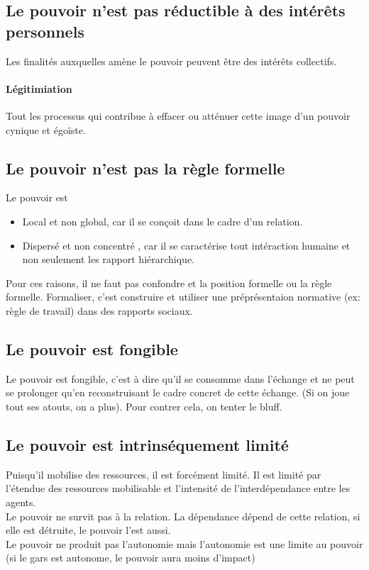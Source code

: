\documentclass[11pt]{article} %
\begin{document}
	\subsection{Le pouvoir n'est pas réductible à des intérêts personnels}
		Les finalités auxquelles amène le pouvoir peuvent être des intérêts collectifs.
		\paragraph{Légitimiation} Tout les processus qui contribue à effacer ou atténuer cette image d'un
		pouvoir cynique et égoïste.
	\subsection{Le pouvoir n'est pas la règle formelle}
		Le pouvoir est
		\begin{itemize}
			\item Local et non global, car il se conçoit dans le cadre d'un relation.
			\item Dispersé et non concentré , car il se caractérise tout intéraction humaine et non 
			seulement les rapport hiérarchique.
		\end{itemize}
		Pour ces raisons, il ne faut pas confondre et la position formelle ou la règle formelle. Formaliser, c'est
		construire et utiliser une préprésentaion normative (ex: règle de travail) dans des rapports sociaux.
	\subsection{Le pouvoir est fongible}
		Le pouvoir est fongible, c'est à dire qu'il se consomme dans l'échange et ne peut se prolonger qu'en
		reconstruisant le cadre concret de cette échange. (Si on joue tout ses atouts, on a plus).
		Pour contrer cela, on tenter le bluff.
	\subsection{Le pouvoir est intrinséquement limité}
		Puisqu'il mobilise des ressources, il est forcément limité. Il est limité par l'étendue des ressources 
		mobilisable et l'intensité de l'interdépendance entre les agents.\\
		Le pouvoir ne survit pas à la relation. La dépendance dépend de cette relation, si elle est détruite, le 
		pouvoir l'est aussi. \\
		Le pouvoir ne produit pas l'autonomie mais l'autonomie est une limite au pouvoir (si le gars est 
		autonome, le pouvoir aura moins d'impact)
\end{document}
